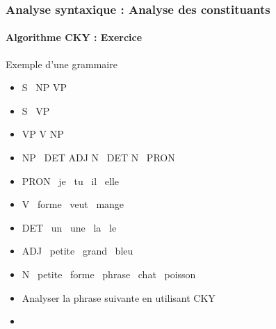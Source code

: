\documentclass[xcolor=table]{beamer}
\begin{document}
\begin{frame}
\frametitle{Analyse syntaxique : Analyse des constituants}
\framesubtitle{Algorithme CKY : Exercice}

\vspace{-6pt}
\begin{exampleblock}{Exemple d'une grammaire}
	\begin{itemize}
		\item S \textrightarrow\ NP VP 
		\item S \textrightarrow\ VP 
		\item VP \textrightarrow V NP
		\item NP \textrightarrow\ DET ADJ N \textbar\ DET N \textbar\ PRON 
		\item PRON \textrightarrow\ je \textbar\ tu \textbar\ il \textbar\ elle
		\item V \textrightarrow\ forme \textbar\ veut \textbar\ mange 
		\item DET \textrightarrow\ un \textbar\ une \textbar\ la \textbar\ le
		\item ADJ \textrightarrow\ petite \textbar\ grand \textbar\ bleu 
		\item N \textrightarrow\ petite \textbar\ forme \textbar\ phrase \textbar\ chat \textbar\ poisson
	\end{itemize}
\end{exampleblock}\vspace{-6pt}

\begin{itemize}
	\item Analyser la phrase suivante en utilisant CKY 
	\item {}
\end{itemize}

\end{frame}
\end{document}
